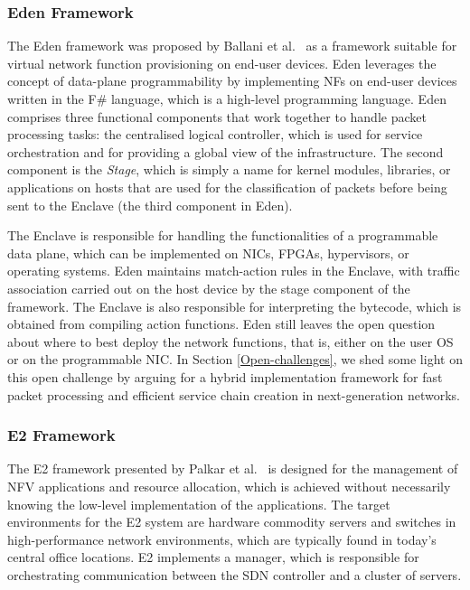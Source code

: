 \documentclass[futureinternet,review,accept,pdftex,moreauthors]{Definitions/mdpi}
\begin{document}
\subsubsection{Eden Framework}
\label{Eden}
The Eden framework was proposed by Ballani {et al.}~\cite{ballani2015enabling} as a framework suitable for virtual network function provisioning on end-user devices. Eden leverages the concept of data-plane programmability by implementing NFs on end-user devices written in the F\# language, which is a high-level programming language. Eden comprises three functional components that work together to handle packet processing tasks: the centralised logical controller, which is used for service orchestration and for providing a global view of the infrastructure. The second component is the \textit{Stage}, which is simply a name for kernel modules, libraries, or applications on hosts that are used for the classification of packets before being sent to the Enclave (the third component in Eden).

The Enclave is responsible for handling the functionalities of a programmable data plane, which can be implemented on NICs, FPGAs, hypervisors, or operating systems. Eden maintains match-action rules in the Enclave, with traffic association carried out on the host device by the stage component of the framework. The Enclave is also responsible for interpreting the bytecode, which is obtained from compiling action functions. Eden still leaves the open question about where to best deploy the network functions, that is, either on the user OS or on the programmable NIC. In Section \ref{Open-challenges}, we shed some light on this open challenge by arguing for a hybrid implementation framework for fast packet processing and efficient service chain creation in next-generation networks.

\subsubsection{E2 Framework}
\label{E2 Framework}
The E2 framework presented by Palkar {et al.}~\cite{palkar2015e2} is designed for the management of NFV applications and resource allocation, which is achieved without necessarily knowing the low-level implementation of the applications. The target environments for the E2 system are hardware commodity servers and switches in high-performance network environments, which are typically found in today's central office locations. E2 implements a manager, which is responsible for orchestrating communication between the SDN controller and a cluster of servers. 
\end{document}
